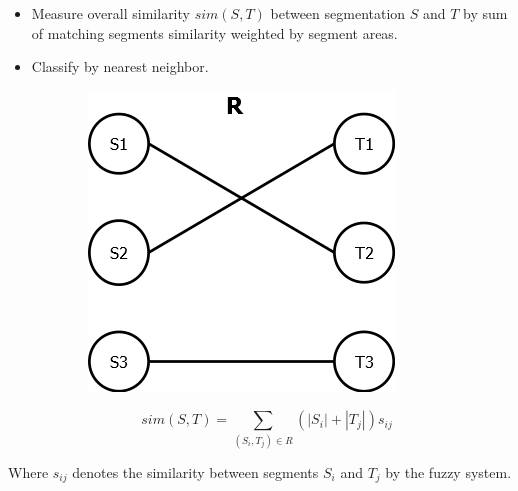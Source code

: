 \documentclass{beamer}
\begin{document}
\begin{frame}
\begin{itemize}
\item Measure overall similarity $sim(S,T)$ between segmentation $S$ and $T$ by sum of matching segments similarity weighted by segment areas.
\item Classify by nearest neighbor.
\end{itemize}

\begin{figure}
\centering
\begin{subfigure}{0.3\textwidth}
\centering
\includegraphics[width=\textwidth]{../images/relation.png}
\end{subfigure}
\begin{subfigure}{0.5\textwidth}
\centering
\[ \quad sim(S,T) = \sum_{(S_i,T_j) \in R}(|S_i| + |T_j|)s_{ij}\]
\end{subfigure}
\end{figure}

Where $s_{ij}$ denotes the similarity between segments $S_i$ and $T_j$ by the fuzzy system.

\end{frame}
\end{document}
